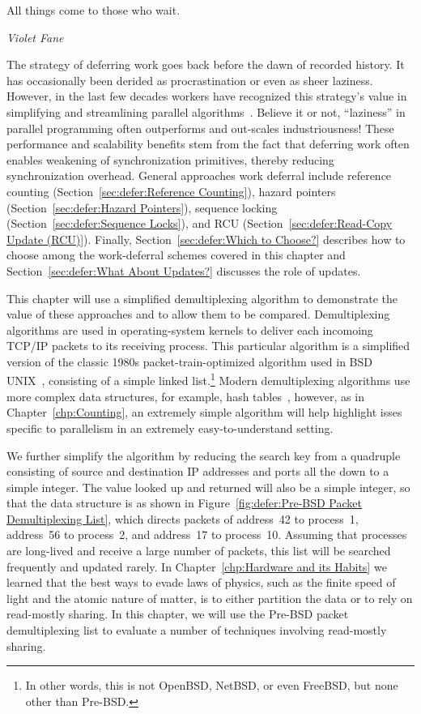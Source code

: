 

\epigraph{All things come to those who wait.}{\emph{Violet Fane}}

The strategy of deferring work goes back before the dawn of recorded
history. It has occasionally been derided as procrastination or
even as sheer laziness.
However, in the last few decades workers have recognized this strategy's value
in simplifying and streamlining parallel algorithms~\cite{Kung80,HMassalinPhD}.
Believe it or not, ``laziness'' in parallel programming often outperforms and
out-scales industriousness!
These performance and scalability benefits stem from the fact that
deferring work often enables weakening of synchronization primitives,
thereby reducing synchronization overhead.
General approaches work deferral include
reference counting (Section~\ref{sec:defer:Reference Counting}),
hazard pointers (Section~\ref{sec:defer:Hazard Pointers}),
sequence locking (Section~\ref{sec:defer:Sequence Locks}),
and RCU (Section~\ref{sec:defer:Read-Copy Update (RCU)}).
Finally, Section~\ref{sec:defer:Which to Choose?}
describes how to choose among the work-deferral schemes covered in
this chapter and Section~\ref{sec:defer:What About Updates?}
discusses the role of updates.

This chapter will use a simplified demultiplexing algorithm to demonstrate
the value of these approaches and to allow them to be compared.
Demultiplexing algorithms are used in operating-system kernels to
deliver each incomoing TCP/IP packets to its receiving process.
This particular algorithm is a simplified version of the classic 1980s
packet-train-optimized algorithm used in BSD UNIX~\cite{VanJacobson88},
consisting of a simple linked list.\footnote{
	In other words, this is not OpenBSD, NetBSD, or even
	FreeBSD, but none other than Pre-BSD.}
Modern demultiplexing algorithms use more complex data structures,
for example, hash tables~\cite{McKenney92b}, however, as in
Chapter~\ref{chp:Counting}, an extremely simple algorithm will
help highlight isses specific to parallelism in an extremely
easy-to-understand setting.

We further simplify the algorithm by reducing the search key from
a quadruple consisting of source and destination IP addresses and
ports all the down to a simple integer.
The value looked up and returned will also be a simple integer,
so that the data structure is as shown in
Figure~\ref{fig:defer:Pre-BSD Packet Demultiplexing List}, which
directs packets of address~42 to process~1, address~56 to
process~2, and address~17 to process~10.
Assuming that processes are long-lived and receive a large number
of packets, this list will be searched frequently and updated
rarely.
In Chapter~\ref{chp:Hardware and its Habits}
we learned that the best ways to evade laws of physics, such as
the finite speed of light and the atomic nature of matter, is to
either partition the data or to rely on read-mostly sharing.
In this chapter, we will use the Pre-BSD packet demultiplexing
list to evaluate a number of techniques involving read-mostly
sharing.

